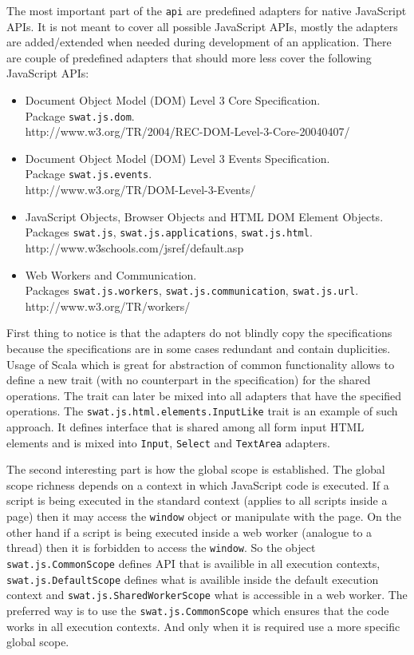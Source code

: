 \documentclass[12pt,a4paper]{report}
\begin{document}
The most important part of the \texttt{api} are predefined adapters for native JavaScript APIs. It is not meant to cover all possible JavaScript APIs, mostly the adapters are added/extended when needed during development of an application. There are couple of predefined adapters that should more less cover the following JavaScript APIs:

\begin{itemize}
\item Document Object Model (DOM) Level 3 Core Specification.\\
Package \texttt{swat.js.dom}.\\
http://www.w3.org/TR/2004/REC-DOM-Level-3-Core-20040407/
\item Document Object Model (DOM) Level 3 Events Specification.\\
Package \texttt{swat.js.events}.\\
http://www.w3.org/TR/DOM-Level-3-Events/
\item JavaScript Objects, Browser Objects and HTML DOM Element Objects.\\
Packages \texttt{swat.js}, \texttt{swat.js.applications}, \texttt{swat.js.html}.\\
http://www.w3schools.com/jsref/default.asp
\item Web Workers and Communication.\\
Packages \texttt{swat.js.workers}, \texttt{swat.js.communication}, \texttt{swat.js.url}.\\
http://www.w3.org/TR/workers/
\end{itemize}

First thing to notice is that the adapters do not blindly copy the specifications because the specifications are in some cases redundant and contain duplicities. Usage of Scala which is great for abstraction of common functionality allows to define a new trait (with no counterpart in the specification) for the shared operations. The trait can later be mixed into all adapters that have the specified operations. The \texttt{swat.js.html.elements.InputLike} trait is an example of such approach. It defines interface that is shared among all form input HTML elements and is mixed into \texttt{Input}, \texttt{Select} and \texttt{TextArea} adapters.

The second interesting part is how the global scope is established. The global scope richness depends on a context in which JavaScript code is executed. If a script is being executed in the standard context (applies to all scripts inside a page) then it may access the \texttt{window} object or manipulate with the page. On the other hand if a script is being executed inside a web worker (analogue to a thread) then it is forbidden to access the \texttt{window}. So the object \texttt{swat.js.CommonScope} defines API that is availible in all execution contexts, \texttt{swat.js.DefaultScope} defines what is availible inside the default execution context and \texttt{swat.js.SharedWorkerScope} what is accessible in a web worker. The preferred way is to use the \texttt{swat.js.CommonScope} which ensures that the code works in all execution contexts. And only when it is required use a more specific global scope.
\end{document}
